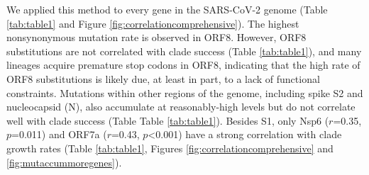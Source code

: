 \documentclass[11pt,oneside,letterpaper]{article}
\begin{document}
We applied this method to every gene in the SARS-CoV-2 genome (Table \ref{tab:table1} and Figure \ref{fig:correlationcomprehensive}). The highest nonsynonymous mutation rate is observed in ORF8.
However, ORF8 substitutions are not correlated with clade success (Table \ref{tab:table1}), and many lineages acquire premature stop codons in ORF8, indicating that the high rate of ORF8 substitutions is likely due, at least in part, to a lack of functional constraints.
Mutations within other regions of the genome, including spike S2 and nucleocapsid (N), also accumulate at reasonably-high levels but do not correlate well with clade success (Table Table \ref{tab:table1}).
Besides S1, only Nsp6 ($r$=0.35, $p$=0.011) and ORF7a ($r$=0.43, $p$\textless0.001) have a strong correlation with clade growth rates (Table \ref{tab:table1}, Figures \ref{fig:correlationcomprehensive} and \ref{fig:mutaccummoregenes}).
\end{document}
